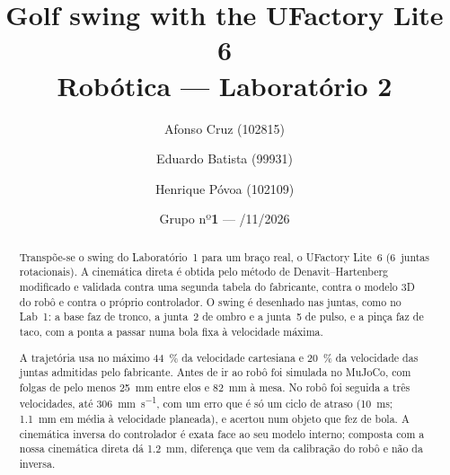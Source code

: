 \documentclass[11pt,a4paper]{article}
\title{{\color{verde}\textbf{Golf swing with the UFactory Lite 6}}\\[2mm]
       {\large\color{azul} Robótica --- Laboratório 2}}
\author{{Afonso Cruz (102815)} \and {Eduardo Batista (99931)} \and {Henrique Póvoa (102109)}}
\date{Grupo {nº\textbf{1}} \quad --- \quad 13/11/2026}
\begin{document}
\maketitle

\begin{abstract}
\begin{caixaresumo}
Transpõe-se o swing do Laboratório~1 para um braço real, o UFactory Lite~6
(6~juntas rotacionais). A cinemática direta é obtida pelo método de
Denavit--Hartenberg modificado e validada contra uma segunda tabela do
fabricante, contra o modelo 3D do robô e contra o próprio controlador. O
swing é desenhado nas juntas, como no Lab~1: a base faz de tronco, a junta~2
de ombro e a junta~5 de pulso, e a pinça faz de taco, com a ponta a passar
numa bola fixa à velocidade máxima.

A trajetória usa no máximo \SI{44}{\percent} da velocidade cartesiana e
\SI{20}{\percent} da velocidade das juntas admitidas pelo fabricante. Antes
de ir ao robô foi simulada no MuJoCo, com folgas de pelo menos
\SI{25}{\milli\meter} entre elos e \SI{82}{\milli\meter} à mesa. No robô foi
seguida a três velocidades, até \SI{306}{\milli\meter\per\second}, com um
erro que é só um ciclo de atraso (\SI{10}{\milli\second};
\SI{1.1}{\milli\meter} em média à velocidade planeada), e acertou num objeto
que fez de bola. A cinemática inversa do controlador é exata face
ao seu modelo interno; composta com a nossa cinemática direta dá
\SI{1.2}{\milli\meter}, diferença que vem da calibração do robô e não da
inversa.
\end{caixaresumo}
\end{abstract}





\end{document}
